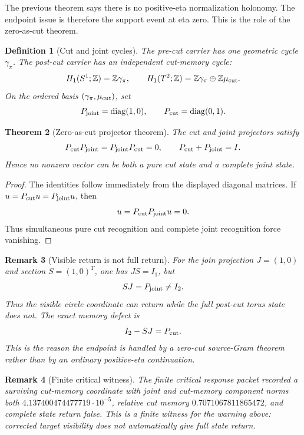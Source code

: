 \documentclass[11pt]{article}
\newtheorem{theorem}{Theorem}[section]
\newtheorem{definition}[theorem]{Definition}
\newtheorem{remark}[theorem]{Remark}
\newcommand{\diag}{\operatorname{diag}}
\begin{document}
The previous theorem says there is no positive-eta normalization holonomy.  The endpoint issue is therefore the support event at eta zero.  This is the role of the zero-as-cut theorem.

\begin{definition}[Cut and joint cycles]
The pre-cut carrier has one geometric cycle \(\gamma_\pi\).  The post-cut carrier has an independent cut-memory cycle:
\[
H_1(S^1;\mathbb Z)=\mathbb Z\gamma_\pi,
\qquad
H_1(T^2;\mathbb Z)=\mathbb Z\gamma_\pi\oplus\mathbb Z\mu_{\rm cut}.
\]
On the ordered basis \((\gamma_\pi,\mu_{\rm cut})\), set
\[
P_{\rm joint}=\diag(1,0),
\qquad
P_{\rm cut}=\diag(0,1).
\]
\end{definition}

\begin{theorem}[Zero-as-cut projector theorem]
The cut and joint projectors satisfy
\[
P_{\rm cut}P_{\rm joint}=P_{\rm joint}P_{\rm cut}=0,
\qquad
P_{\rm cut}+P_{\rm joint}=I.
\]
Hence no nonzero vector can be both a pure cut state and a complete joint state.
\end{theorem}

\begin{proof}
The identities follow immediately from the displayed diagonal matrices.  If \(u=P_{\rm cut}u=P_{\rm joint}u\), then
\[
u=P_{\rm cut}P_{\rm joint}u=0.
\]
Thus simultaneous pure cut recognition and complete joint recognition force vanishing.
\end{proof}

\begin{remark}[Visible return is not full return]
For the join projection \(J=(1,0)\) and section \(S=(1,0)^T\), one has \(JS=I_1\), but
\[
SJ=P_{\rm joint}\ne I_2.
\]
Thus the visible circle coordinate can return while the full post-cut torus state does not.  The exact memory defect is
\[
I_2-SJ=P_{\rm cut}.
\]
This is the reason the endpoint is handled by a zero-cut source-Gram theorem rather than by an ordinary positive-eta continuation.
\end{remark}

\begin{remark}[Finite critical witness]
The finite critical response packet recorded a surviving cut-memory coordinate with joint and cut-memory component norms both \(4.137400474477719\cdot10^{-5}\), relative cut memory \(0.7071067811865472\), and complete state return false.  This is a finite witness for the warning above: corrected target visibility does not automatically give full state return.
\end{remark}
\end{document}

